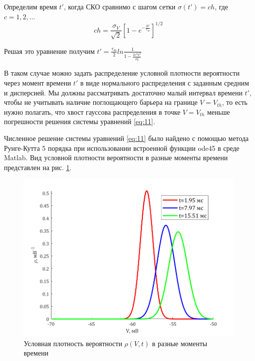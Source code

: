 Определим время $t'$, когда СКО сравнимо с шагом сетки $\sigma(t')=ch$, где $c=1,2,\ldots$
\begin{equation}
	ch=\frac{\sigma_V}{\sqrt{2}}\left[1-e^{-\frac{2t'}{\tau_m}}\right]^{1/2}
	\label{eq:15}
\end{equation}

Решая это уравнение получим $\displaystyle t'=\frac{\tau_m}{2}ln\frac{1}{1-\frac{2c^2h^2}{\sigma_V^2}}$

В таком случае можно задать распределение условной плотности вероятности через момент времени $t'$ в виде нормального распределения с заданным средним и дисперсией. Мы должны рассматривать достаточно малый интервал времени $t'$, чтобы не учитывать наличие поглощающего барьера на границе $V=V_{th}$, то есть нужно полагать, что хвост гауссова распределения в точке $V=V_{th}$ меньше погрешности решения системы уравнений \eqref{eq:11}.

Численное решение системы уравнений \eqref{eq:11} было найдено с помощью метода Рунге-Кутта 5 порядка при использовании встроенной функции ode45 в среде Matlab. Вид условной плотности вероятности в разные моменты времени представлен на рис. \ref{pic:1}.
\begin{figure}[H]
	\centering
	\includegraphics[width=\linewidth]{pic/rho.png}
	\caption{Условная плотность вероятности $\rho(V,t)$  в разные моменты времени}
	\label{pic:1}
\end{figure}

